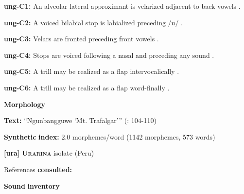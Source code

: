\documentclass[output=paper]{langsci/langscibook}
\begin{document}
\begin{styleBody}
\textbf{ung-C1:} An alveolar lateral approximant is velarized adjacent to back vowels \citep[11]{Rumsey1978}.
\end{styleBody}

\begin{styleBody}
\textbf{ung-C2:} A voiced bilabial stop is labialized preceding /u/ \citep[9-10]{Rumsey1978}.
\end{styleBody}

\begin{styleBody}
\textbf{ung-C3:} Velars are fronted preceding front vowels \citep[11]{Rumsey1978}.
\end{styleBody}

\begin{styleBody}
\textbf{ung-C4:} Stops are voiced following a nasal and preceding any sound \citep[9]{Rumsey1978}.
\end{styleBody}

\begin{styleBody}
\textbf{ung-C5:} A trill may be realized as a flap intervocalically \citep[12]{Rumsey1978}.
\end{styleBody}

\begin{styleBody}
\textbf{ung-C6:} A trill may be realized as a flap word-finally \citep[12]{Rumsey1978}.
\end{styleBody}

\begin{styleBody}
\textbf{Morphology}
\end{styleBody}

\begin{styleBody}
\textbf{Text:} “Ngunbangguwe ‘Mt. Trafalgar’” (\citealt{CoateOates1970}: 104-110)
\end{styleBody}

\begin{styleBody}
\textbf{Synthetic} \textbf{index:} 2.0 morphemes/word (1142 morphemes, 573 words)
\end{styleBody}

\begin{styleBody}
\textbf{[ura]}   \textbf{\textsc{Urarina}}  isolate (Peru)
\end{styleBody}

\begin{styleBody}
References \textbf{consulted:} \citet{Olawsky2006}
\end{styleBody}

\begin{styleBody}
\textbf{Sound} \textbf{inventory}
\end{styleBody}
\end{document}
